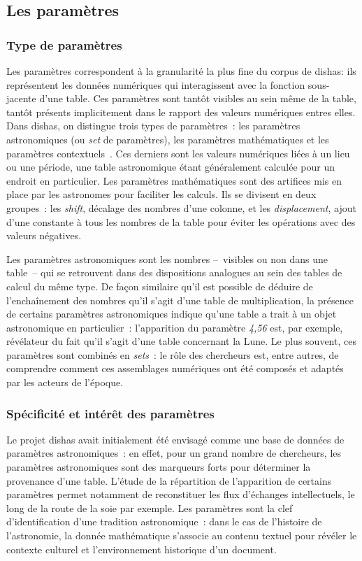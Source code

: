 \documentclass[a4paper,12pt,twoside]{book}
\newcommand{\eng}{\emph}
\newcommand{\g}[1]{\og#1~\fg}
\newcommand{\dishas}{\gls{dishas}\xspace}
\begin{document}
		\subsection{Les paramètres}
			\subsubsection{Type de paramètres}
Les paramètres correspondent à la granularité la plus fine du corpus de \dishas: ils représentent les données numériques qui interagissent avec la fonction sous-jacente d'une table. Ces paramètres sont tantôt visibles au sein même de la table, tantôt présents implicitement dans le rapport des valeurs numériques entres elles. Dans \dishas, on distingue trois types de paramètres~: les paramètres astronomiques (ou \eng{set} de paramètres), les paramètres mathématiques et les paramètres \g{contextuels}. Ces derniers sont les valeurs numériques liées à un lieu ou une période, une table astronomique étant généralement calculée pour un endroit en particulier. Les paramètres mathématiques sont des artifices mis en place par les astronomes pour faciliter les calculs. Ils se divisent en deux groupes~: les \eng{shift}, décalage des nombres d'une colonne, et les \eng{displacement}, ajout d'une constante à tous les nombres de la table pour éviter les opérations avec des valeurs négatives.

Les paramètres astronomiques sont les nombres –~visibles ou non dans une table~– qui se retrouvent dans des dispositions analogues au sein des tables de calcul du même type. De façon similaire qu'il est possible de déduire de l'enchaînement des nombres qu'il s'agit d'une table de multiplication, la présence de certains paramètres astronomiques indique qu'une table a trait à un objet astronomique en particulier~: l'apparition du paramètre \emph{4,56} est, par exemple, révélateur du fait qu'il s'agit d'une table concernant la Lune. Le plus souvent, ces paramètres sont combinés en \eng{sets}~: le rôle des chercheurs est, entre autres, de comprendre comment ces assemblages numériques ont été composés et adaptés par les acteurs de l'époque.

			\subsubsection{Spécificité et intérêt des paramètres}
Le projet \dishas avait initialement été envisagé comme une base de données de paramètres astronomiques~: en effet, pour un grand nombre de chercheurs, les paramètres astronomiques sont des marqueurs forts pour déterminer la provenance d’une table. L’étude de la répartition de l’apparition de certains paramètres permet notamment de reconstituer les flux d’échanges intellectuels, le long de la route de la soie par exemple. Les paramètres sont la clef d'identification d'une tradition astronomique~: dans le cas de l'histoire de l'astronomie, la donnée mathématique s'associe au contenu textuel pour révéler le contexte culturel et l'environnement historique d'un document.
\end{document}
